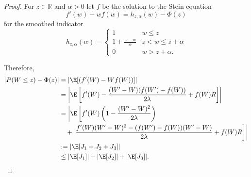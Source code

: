 \begin{proof}
  For $z \in \mathbb{R}$ and $\alpha > 0$ let $f$ be the solution to the Stein equation 
  \begin{equation}
    f'(w) - wf(w) = h_{z,\alpha}(w) - \Phi(z)
  \end{equation}
  for the smoothed indicator
  \begin{equation}
    h_{z,\alpha}(w) =
    \begin{cases}
      1 & w \leq z \\
      1 + \frac{z-w}{\alpha} & z < w \leq z + \alpha \\
      0 & w > z + \alpha.
    \end{cases}
  \end{equation}

  Therefore,
  \begin{equation}
    \begin{split}
      |P(W \leq z) - \Phi(z)| &= |\E [(f'(W)-Wf(W))] | \\
      &= \left | \E \left [ 
          f'(W) - \frac{(W'-W)(f(W')-f(W))}{2\lambda} +f(W)R
        \right ]\right | \\
      &= \left | \E \left [f'(W)\left (1-\frac{(W'-W)^2}{2\lambda}\right) \right . \right . \\
      &\quad + \left . \left . 
          \frac{f'(W)(W'-W)^2-(f(W')-f(W))(W'-W)}{2\lambda} + f(W)R
        \right ] \right | \\
      &:= | \E [J_1 + J_2 + J_3] | \\
      &\leq |\E [J_1]| + |\E [J_2]| + |\E [J_3]|.
    \end{split}
  \end{equation}


\end{proof}
